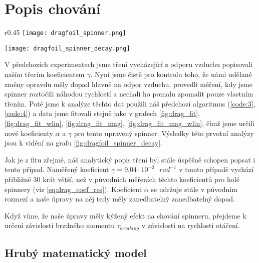 \clearpage

\section{Popis chování}

\begin{wrapfigure}{r}{0.45\textwidth}
    \vspace{-1cm}
    \texttt{[image: dragfoil\_spinner.png]}
    \centering
    \caption{Spinner upravený k měření přenášeného momentu síly.}
    \label{fig:dragfoil_spinner}

    \vspace{1cm}
    \texttt{[image: dragfoil\_spinner\_decay.png]}
    \centering
    \caption{Výsledky měření k určení třecích koeficientů spinneru.}
    \label{fig:dragfoil_spinner_decay}
\end{wrapfigure}

V předchozích experimentech jsme tření vycházející z odporu vzduchu popisovali naším třecím koeficientem $\gamma$. Nyní jsme čistě pro kontrolu toho, že námi udělané změny opravdu měly dopad hlavně na odpor vzduchu, provedli měření, kdy jsme spinner roztočili  náhodou rychlostí a nechali ho pomalu zpomalit pouze vlastním třením. Poté jsme k analýze těchto dat použili náš předchozí algoritmus (\autoref{code:3},\autoref{code:4}) a data jsme fitovali stejně jako v grafech \ref{fig:drag_fit}, \ref{fig:drag_fit_wlin}, \ref{fig:drag_fit_mag}, \ref{fig:drag_fit_mag_wlin}, čímž jsme určili nové koeficienty $\alpha$ a $\gamma$ pro tento upravený spinner. Výsledky této prvotní analýzy jsou k vidění na grafu \ref{fig:dragfoil_spinner_decay}.

Jak je z fitu zřejmé, náš analytický popis tření byl stále úspěšně schopen popsat i tento případ. Naměřený koeficient $\gamma = 9.04\cdot10^{-3} \text{ } rad^{-1}$ v tomto případě vychází přibližně 30 krát větší, než v původních měřeních těchto koeficientů pro holé spinnery (viz \autoref{eq:drag_coef_res}). Koeficient $\alpha$ se udržuje stále v původním rozmezí a naše úpravy na něj tedy měly zanedbatelný zanedbatelný dopad.

Když víme, že naše úpravy měly kýžený efekt na chování spinneru, přejdeme k určení závislosti brzdného momentu $\tau_{breaking}$ v závislosti na rychlosti otáčení.

\subsection{Hrubý matematický model}

